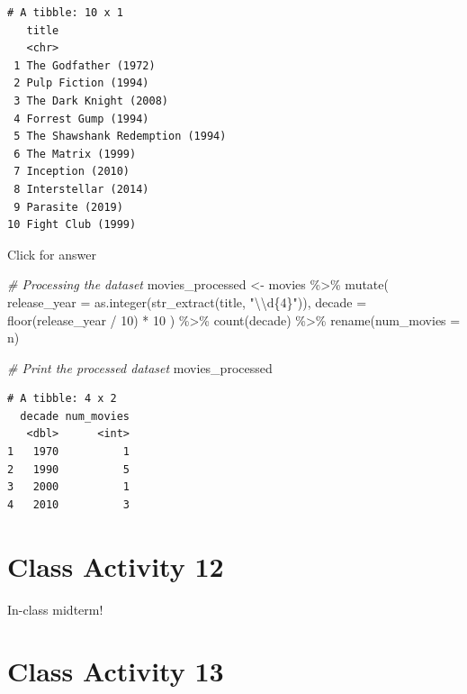 \documentclass[
]{book}
\newenvironment{Shaded}{\begin{snugshade}}{\end{snugshade}}
\newcommand{\AttributeTok}[1]{\textcolor[rgb]{0.77,0.63,0.00}{#1}}
\newcommand{\CommentTok}[1]{\textcolor[rgb]{0.56,0.35,0.01}{\textit{#1}}}
\newcommand{\DecValTok}[1]{\textcolor[rgb]{0.00,0.00,0.81}{#1}}
\newcommand{\FunctionTok}[1]{\textcolor[rgb]{0.00,0.00,0.00}{#1}}
\newcommand{\NormalTok}[1]{#1}
\newcommand{\OtherTok}[1]{\textcolor[rgb]{0.56,0.35,0.01}{#1}}
\newcommand{\SpecialCharTok}[1]{\textcolor[rgb]{0.00,0.00,0.00}{#1}}
\newcommand{\StringTok}[1]{\textcolor[rgb]{0.31,0.60,0.02}{#1}}
\begin{document}
\begin{verbatim}
# A tibble: 10 x 1
   title                          
   <chr>                          
 1 The Godfather (1972)           
 2 Pulp Fiction (1994)            
 3 The Dark Knight (2008)         
 4 Forrest Gump (1994)            
 5 The Shawshank Redemption (1994)
 6 The Matrix (1999)              
 7 Inception (2010)               
 8 Interstellar (2014)            
 9 Parasite (2019)                
10 Fight Club (1999)              
\end{verbatim}

Click for answer

\begin{Shaded}
\begin{Highlighting}[]
\CommentTok{\# Processing the dataset}
\NormalTok{movies\_processed }\OtherTok{\textless{}{-}}\NormalTok{ movies }\SpecialCharTok{\%\textgreater{}\%}
  \FunctionTok{mutate}\NormalTok{(}
    \AttributeTok{release\_year =} \FunctionTok{as.integer}\NormalTok{(}\FunctionTok{str\_extract}\NormalTok{(title, }\StringTok{"}\SpecialCharTok{\textbackslash{}\textbackslash{}}\StringTok{d\{4\}"}\NormalTok{)),}
    \AttributeTok{decade =} \FunctionTok{floor}\NormalTok{(release\_year }\SpecialCharTok{/} \DecValTok{10}\NormalTok{) }\SpecialCharTok{*} \DecValTok{10}
\NormalTok{  ) }\SpecialCharTok{\%\textgreater{}\%}
  \FunctionTok{count}\NormalTok{(decade) }\SpecialCharTok{\%\textgreater{}\%}
  \FunctionTok{rename}\NormalTok{(}\AttributeTok{num\_movies =}\NormalTok{ n)}

\CommentTok{\# Print the processed dataset}
\NormalTok{movies\_processed}
\end{Highlighting}
\end{Shaded}

\begin{verbatim}
# A tibble: 4 x 2
  decade num_movies
   <dbl>      <int>
1   1970          1
2   1990          5
3   2000          1
4   2010          3
\end{verbatim}

\hypertarget{class-activity-12}{%
\chapter{Class Activity 12}\label{class-activity-12}}

In-class midterm!

\hypertarget{class-activity-13}{%
\chapter{Class Activity 13}\label{class-activity-13}}
\end{document}
